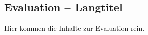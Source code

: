 \begin{showEvaluation}%
\chapter[Evaluation -- Kurztitel für Inhaltsverzeichnis und Kolumnentitel]{Evaluation -- Langtitel}%
\label{chap:Evaluation}
%
Hier kommen die Inhalte zur Evaluation rein.
%
%
\end{showEvaluation}%